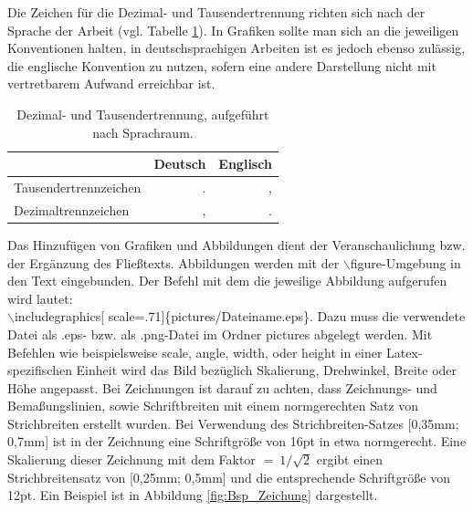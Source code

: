 Die Zeichen für die Dezimal- und Tausendertrennung richten sich nach der Sprache der Arbeit (vgl. Tabelle \ref{tab:Trennzeichen}). In Grafiken sollte man sich an die jeweiligen Konventionen halten, in deutschsprachigen Arbeiten ist es jedoch ebenso zulässig, die englische Konvention zu nutzen, sofern eine andere Darstellung nicht mit vertretbarem Aufwand erreichbar ist.
\begin{table}
\centering
\begin{tabular}{lrr}
\toprule
							& Deutsch	& Englisch\\
\midrule
Tausendertrennzeichen		& .			& ,\\
Dezimaltrennzeichen 		& ,			& .\\
\bottomrule
\end{tabular}
\caption{Dezimal- und Tausendertrennung, aufgeführt nach Sprachraum.}
\label{tab:Trennzeichen}
\end{table}
%
Das Hinzufügen von Grafiken und Abbildungen dient der Veranschaulichung bzw. der Ergänzung des Fließtexts. Abbildungen werden mit der $\backslash$figure-Umgebung in den Text eingebunden. Der Befehl mit dem die jeweilige Abbildung aufgerufen wird lautet:\\
$\backslash$includegraphics[ scale=.71]\{pictures/Dateiname.eps\}. Dazu muss die verwendete Datei als .eps- bzw. als .png-Datei im Ordner \glqq pictures\grqq \! abgelegt werden. Mit Befehlen wie beispielsweise scale, angle, width, oder height in einer Latex-spezifischen Einheit wird das Bild bezüglich Skalierung, Drehwinkel, Breite oder Höhe angepasst. Bei Zeichnungen ist darauf zu achten, dass Zeichnungs- und Bemaßungslinien, sowie Schriftbreiten mit einem normgerechten Satz von Strichbreiten erstellt wurden. Bei Verwendung des Strichbreiten-Satzes [0,35mm; 0,7mm] ist in der Zeichnung eine Schriftgröße von 16pt in etwa normgerecht. Eine Skalierung dieser Zeichnung mit dem Faktor $\mathrm{=\:1/\sqrt{2}}$ ergibt einen Strichbreitensatz von [0,25mm; 0,5mm] und die entsprechende Schriftgröße von 12pt. Ein Beispiel ist in Abbildung \ref{fig:Bsp_Zeichung} dargestellt.
